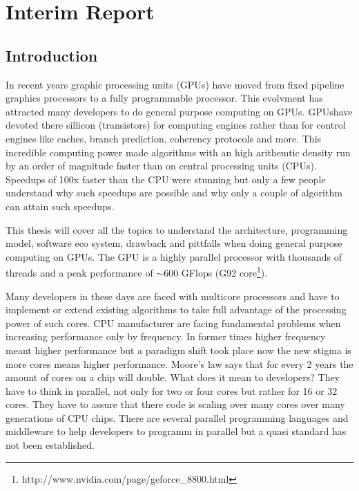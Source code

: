 \chapter{Interim Report}
\label{ch:interim_report}
\section*{Introduction} 
\label{sub:introduction} 

In recent years graphic processing units (GPUs) have moved from fixed pipeline
graphics processors to a fully programmable processor. This evolvment has
attracted many developers to do general purpose computing on GPUs. \glspl{GPU}have
devoted there sillicon (transistors) for computing engines rather than for
control engines like caches, branch prediction, coherency protocols and more.
This incredible computing power made algorithms with an high arithemtic density
run by an order of magnitude faster than on central processing units (CPUs).
Speedups of 100x faster than the CPU were stunning but only a few people
understand why such speedups are possible and why only a couple of algorithm can
attain such speedups.

This thesis will cover all the topics to understand the architecture,
programming model, software eco system, drawback and pittfalls when doing
general purpose computing on GPUs. The \gls{GPU} is a highly parallel processor with
thousands of threads and a peak performance of $\sim$600 GFlops (G92
core\footnote{http://www.nvidia.com/page/geforce\_8800.html}).

Many developers in these days are faced with multicore processors and have to
implement or extend existing algorithms to take full advantage of the
processing power of such cores. CPU manufacturer are facing fundamental problems
when increasing performance only by frequency. In former times higher frequency
meant higher performance but a paradigm shift took place now the new stigma is
more cores means higher performance. Moore's law says that for every 2 years the
amount of cores on a chip will double. What does it mean to developers? They
have to think in parallel, not only for two or four cores but rather for 16 or
32 cores. They have to assure that there code is scaling over many cores over
many generations of CPU chips. There are several parallel programming languages
and middleware to help developers to programm in parallel but a quasi standard
has not been established.

